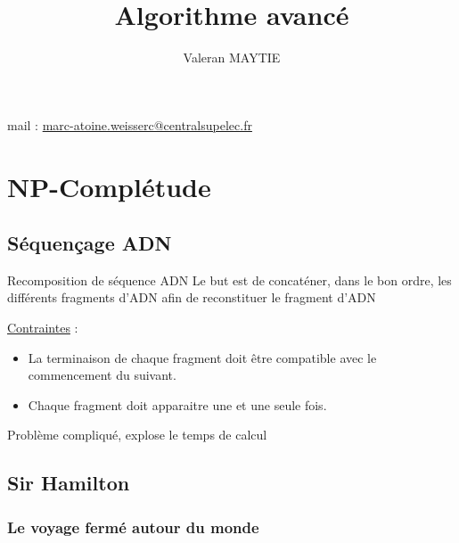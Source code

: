 \documentclass{article}
\title{Algorithme avancé}
\author{Valeran MAYTIE}
\date{}
\begin{document}
  \maketitle{}

  mail : \href{mailto:marc-atoine.weisserc@centralsupelec.fr}
              {marc-atoine.weisserc@centralsupelec.fr}

  \tableofcontents{}

  \section{NP-Complétude}

    \subsection{Séquençage ADN}
    
      Recomposition de séquence ADN
      Le but est de concaténer, dans le bon ordre, les différents fragments
      d'ADN afin de reconstituer le fragment d'ADN

      \underline{Contraintes} :
      \begin{itemize}
        \item La terminaison de chaque fragment doit être compatible
              avec le commencement du suivant.

        \item Chaque fragment doit apparaitre une et une seule fois.
      \end{itemize}

      Problème compliqué, explose le temps de calcul

    \subsection{Sir Hamilton}

      \subsubsection{Le voyage fermé autour du monde} \vspace{5mm}
  
\end{document}
